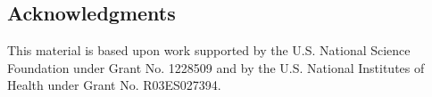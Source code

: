 \documentclass[a0,portrait]{a0poster}
\begin{document}
\begin{multicols}{3}



\subsection*{Acknowledgments}

This material is based upon work supported by the U.S. National Science Foundation under Grant No. 1228509 and by the U.S. National Institutes of Health under Grant No. R03ES027394.



\end{multicols}
\end{document}

